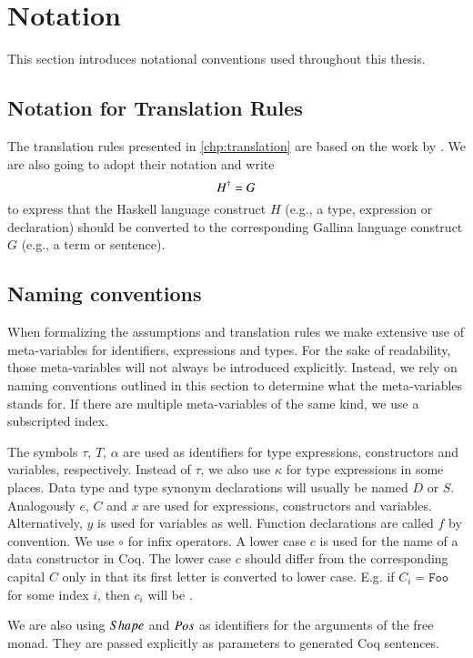 \section{Notation} \label{sec:preliminaries:notation}
This section introduces notational conventions used throughout this thesis.

\subsection{Notation for Translation Rules}
The translation rules presented in \autoref{chp:translation} are based on the work by \cite{Abel:2005}.
We are also going to adopt their notation and write
\[
  {H}^{\dagger} = G
\]
to express that the Haskell language construct $H$ (e.g., a type, expression or declaration) should be converted to the corresponding Gallina language construct $G$ (e.g., a term or sentence).

\subsection{Naming conventions}
When formalizing the assumptions and translation rules we make extensive use of meta-variables for identifiers, expressions and types.
For the sake of readability, those meta-variables will not always be introduced explicitly.
Instead, we rely on naming conventions outlined in this section to determine what the meta-variables stands for.
If there are multiple meta-variables of the same kind, we use a subscripted index.

The symbols $\tau$, $T$, $\alpha$ are used as identifiers for type expressions, constructors and variables, respectively.
Instead of $\tau$, we also use $\kappa$ for type expressions in some places.
Data type and type synonym declarations will usually be named $D$ or $S$.
Analogously $e$, $C$ and $x$ are used for expressions, constructors and variables.
Alternatively, $y$ is used for variables as well.
Function declarations are called $f$ by convention.
We use $\circ$ for infix operators.
A lower case $c$ is used for the name of a data constructor in Coq.
The lower case $c$ should differ from the corresponding capital $C$ only in that its first letter is converted to lower case.
E.g. if $C_i = \texttt{Foo}$ for some index $i$, then $c_i$ will be .

We are also using $Shape$ and $Pos$ as identifiers for the arguments of the free monad.
They are passed explicitly as parameters to generated Coq sentences.

